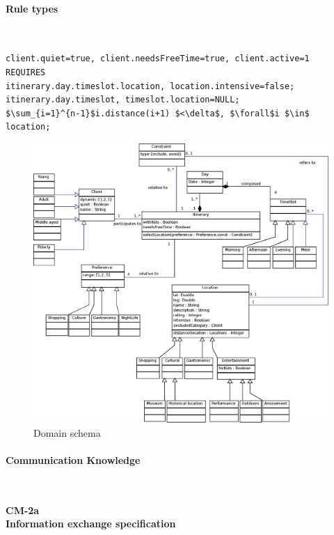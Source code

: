 \documentclass[11pt]{article} %
\newcommand{\myparagraph}[1]{\paragraph{#1}\mbox{}\\}
\def\worksheet#1#2{%
  \begin{center}
  {\large\bf #1} \\
  {\normalsize\bf #2} \\[12pt]
  \begin{footnotesize}
  
  \end{footnotesize}
  \end{center}  
  \vfill}
\begin{document}
\myparagraph{Rule types}

\begin{lstlisting}[label=Rules,caption=The client is a quite person,breaklines=true,mathescape=true]
client.quiet=true, client.needsFreeTime=true, client.active=1
REQUIRES
itinerary.day.timeslot.location, location.intensive=false;
itinerary.day.timeslot, timeslot.location=NULL;
$\sum_{i=1}^{n-1}$i.distance(i+1) $<\delta$, $\forall$i $\in$ location;
\end{lstlisting}

\begin{figure}[H]
\centering
\includegraphics[width=\textwidth]{images/domain.eps}
\caption{Domain schema}
\label{fig:ClassDiagram2}
\end{figure}
\newpage
\myparagraph{Communication Knowledge}
\worksheet{CM-2a}{Information exchange specification}
\end{document}
